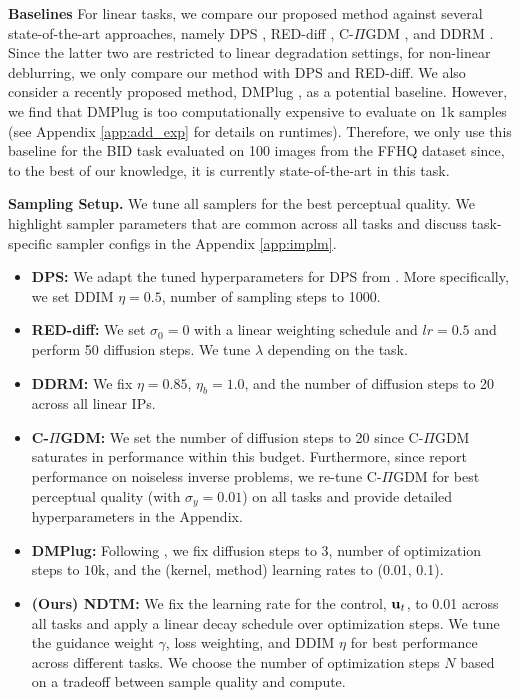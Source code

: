 \textbf{Baselines}
For linear tasks, we compare our proposed method against several state-of-the-art approaches, namely DPS \citep{chung2022diffusion}, RED-diff \citep{reddiff}, C-$\Pi$GDM \citep{pandey2024fast}, and DDRM \citep{kawar2022denoising}. Since the latter two are restricted to linear degradation settings, for non-linear deblurring, we only compare our method with DPS and RED-diff. We also consider a recently proposed method, DMPlug \citep{dmplug}, as a potential baseline. However, we find that DMPlug is too computationally expensive to evaluate on 1k samples  (see Appendix \ref{app:add_exp} for details on runtimes). Therefore, we only use this baseline for the BID task evaluated on 100 images from the FFHQ dataset since, to the best of our knowledge, it is currently state-of-the-art in this task.

\textbf{Sampling Setup.} We tune all samplers for the best perceptual quality. We highlight sampler parameters that are common across all tasks and discuss task-specific sampler configs in the Appendix \ref{app:implm}.
\begin{itemize}
    \item \textbf{DPS:} We adapt the tuned hyperparameters for DPS from \citep{reddiff}. More specifically, we set DDIM $\eta = 0.5$, number of sampling steps to 1000.
    \item \textbf{RED-diff:} We set $\sigma_0=0$ with a linear weighting schedule and $lr=0.5$ and perform 50 diffusion steps. We tune $\lambda$ depending on the task. 
    \item \textbf{DDRM:} We fix $\eta = 0.85$, $\eta_b = 1.0$, and the number of diffusion steps to 20 across all linear IPs.
    \item \textbf{C-$\Pi$GDM:} We set the number of diffusion steps to 20 since C-$\Pi$GDM \citep{pandey2024fast} saturates in performance within this budget. Furthermore, since \citet{pandey2024fast} report performance on noiseless inverse problems, we re-tune C-$\Pi$GDM for best perceptual quality (with $\sigma_y=0.01$) on all tasks and provide detailed hyperparameters in the Appendix.
    \item \textbf{DMPlug:} Following \citep{dmplug}, we fix diffusion steps to $3$, number of optimization steps to $10$k, and the (kernel, method) learning rates to (0.01, 0.1).  
    \item \textbf{(Ours) NDTM:} We fix the learning rate for the control, ${\mathbf{u}}_t$, to 0.01 across all tasks and apply a linear decay schedule over optimization steps. We tune the guidance weight $\gamma$, loss weighting, and DDIM $\eta$ for best performance across different tasks. We choose the number of optimization steps $N$ based on a tradeoff between sample quality and compute.
\end{itemize}




